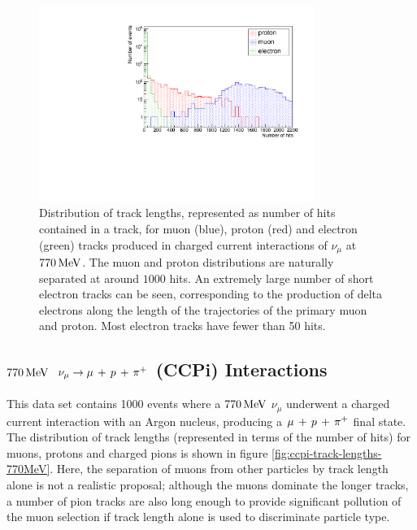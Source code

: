 \begin{figure}
\centering
\includegraphics[angle=-90,width=0.8\textwidth]{chapters/particleid_images/particle-lengths-ccqe-770}
\caption[Track length distribution for $\mu$, $p$ and $e^-$ from $770\MeV$ neutrinos (CCQE)]{\label{fig:ccqe-track-lengths-770MeV}Distribution of track lengths, represented as number of hits contained in a track, for muon (blue), proton (red) and electron (green) tracks produced in charged current interactions of $\nu_\mu$ at $770\MeV$. The muon and proton distributions are naturally separated at around $1000$ hits. An extremely large number of short electron tracks can be seen, corresponding to the production of delta electrons along the length of the trajectories of the primary muon and proton. Most electron tracks have fewer than 50 hits.}
\end{figure}

\subsection{$770\MeV$ \texorpdfstring{$\nu_\mu \rightarrow \mu\,+\,p\,+\,\pi^{+}$}{ν\_μ → μ + p + π⁺} (\texorpdfstring{\acs{CCPi}}{CC1π}) Interactions}
This data set contains 1000 events where a $770\MeV$ $\nu_\mu$ underwent a charged current interaction with an Argon nucleus, producing a $\mu\,+\,p\,+\,\pi^{+}$ final state. The distribution of track lengths (represented in terms of the number of hits) for muons, protons and charged pions is shown in figure \ref{fig:ccpi-track-lengths-770MeV}. Here, the separation of muons from other particles by track length alone is not a realistic proposal; although the muons dominate the longer tracks, a number of pion tracks are also long enough to provide significant pollution of the muon selection if track length alone is used to discriminate particle type.

